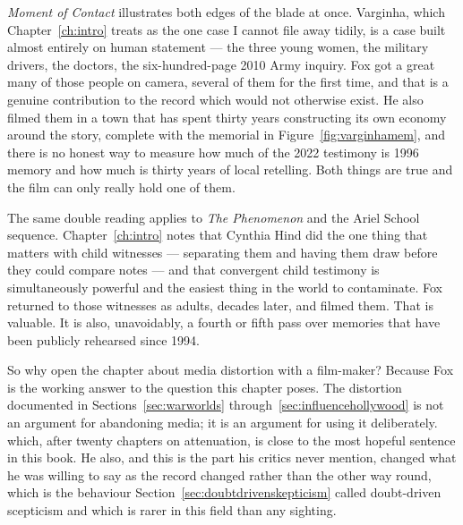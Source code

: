 \emph{Moment of Contact} illustrates both edges of the blade at once. Varginha, which
Chapter~\ref{ch:intro} treats as the one case I cannot file away tidily, is a case built almost
entirely on human statement --- the three young women, the military drivers, the doctors, the
six-hundred-page 2010 Army inquiry. Fox got a great many of those people on camera, several of them
for the first time, and that is a genuine contribution to the record which would not otherwise
exist. He also filmed them in a town that has spent thirty years constructing its own economy around
the story, complete with the memorial in Figure~\ref{fig:varginhamem}, and there is no honest way to
measure how much of the 2022 testimony is 1996 memory and how much is thirty years of local
retelling. Both things are true and the film can only really hold one of them.

The same double reading applies to \emph{The Phenomenon} and the Ariel School sequence.
Chapter~\ref{ch:intro} notes that Cynthia Hind did the one thing that matters with child witnesses
--- separating them and having them draw before they could compare notes --- and that convergent
child testimony is simultaneously powerful and the easiest thing in the world to contaminate. Fox
returned to those witnesses as adults, decades later, and filmed them. That is valuable. It is also,
unavoidably, a fourth or fifth pass over memories that have been publicly rehearsed since 1994.

So why open the chapter about media distortion with a film-maker? Because Fox is the working answer
to the question this chapter poses. The distortion documented in Sections~\ref{sec:warworlds}
through~\ref{sec:influencehollywood} is not an argument for abandoning media; it is an argument for
using it deliberately.  which, after twenty chapters on attenuation, is close to
the most hopeful sentence in this book. He also, and this is the part his critics never mention,
changed what he was willing to say as the record changed rather than the other way round, which is
the behaviour Section~\ref{sec:doubtdrivenskepticism} called doubt-driven scepticism and which is rarer in
this field than any sighting.

